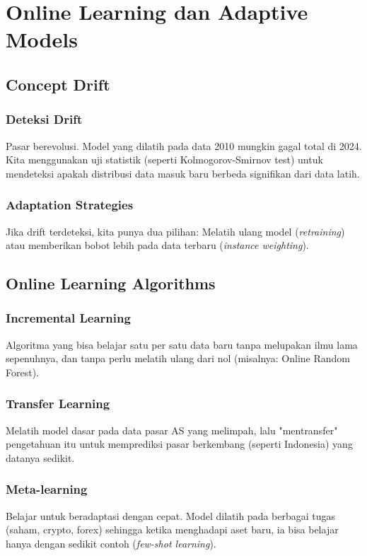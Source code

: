 \documentclass[12pt,a4paper]{book}
\begin{document}
\chapter{Online Learning dan Adaptive Models}
\section{Concept Drift}
\subsection{Deteksi Drift}
Pasar berevolusi. Model yang dilatih pada data 2010 mungkin gagal total di 2024. Kita menggunakan uji statistik (seperti Kolmogorov-Smirnov test) untuk mendeteksi apakah distribusi data masuk baru berbeda signifikan dari data latih.

\subsection{Adaptation Strategies}
Jika drift terdeteksi, kita punya dua pilihan: Melatih ulang model (\textit{retraining}) atau memberikan bobot lebih pada data terbaru (\textit{instance weighting}).

\section{Online Learning Algorithms}
\subsection{Incremental Learning}
Algoritma yang bisa belajar satu per satu data baru tanpa melupakan ilmu lama sepenuhnya, dan tanpa perlu melatih ulang dari nol (misalnya: Online Random Forest).

\subsection{Transfer Learning}
Melatih model dasar pada data pasar AS yang melimpah, lalu "mentransfer" pengetahuan itu untuk memprediksi pasar berkembang (seperti Indonesia) yang datanya sedikit.

\subsection{Meta-learning}
Belajar untuk beradaptasi dengan cepat. Model dilatih pada berbagai tugas (saham, crypto, forex) sehingga ketika menghadapi aset baru, ia bisa belajar hanya dengan sedikit contoh (\textit{few-shot learning}).
\end{document}
